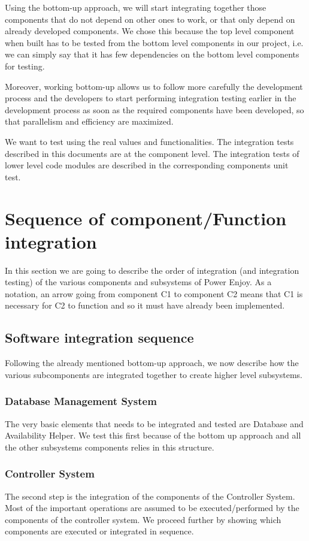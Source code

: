 Using the bottom-up approach, we will start integrating together those components that do not depend on other ones to work, or that only depend on already developed components. We chose this because the top level component when built has to be tested from the bottom level components in our project, i.e. we can simply say that it has few dependencies on the bottom level components for testing.

Moreover, working bottom-up allows us to follow more carefully the development process and the developers to start performing integration testing earlier in the development process as soon as the required components have been developed, so that parallelism and efficiency are maximized.

We want to test using the real values and functionalities. The integration tests described in this documents are at the component level. The integration tests of lower level code modules are described in the corresponding components unit test.

\section{Sequence of component/Function integration}
In this section we are going to describe the order of integration (and integration testing) of the various components and subsystems of Power Enjoy. As a notation, an arrow going from component C1 to component C2 means that C1 is necessary for C2 to function and so it must have already been implemented.

\subsection{Software integration sequence}
Following the already mentioned bottom-up approach, we now describe how the various subcomponents are integrated together to create higher level subsystems.

\subsubsection*{Database Management System}
The very basic elements that needs to be integrated and tested are Database and Availability Helper. We test this first because of the bottom up approach and all the other subsystems components relies in this structure.

\subsubsection*{Controller System}
The second step is the integration of the components of the Controller System. Most of the important operations are assumed to be executed/performed by the components of the controller system. We proceed further by showing which components are executed or integrated in sequence.

